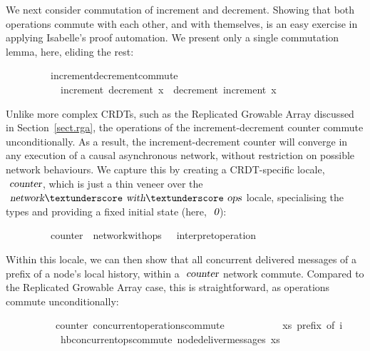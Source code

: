 We next consider commutation of increment and decrement.
Showing that both operations commute with each other, and with themselves, is an easy exercise in applying Isabelle's proof automation.
We present only a single commutation lemma, here, eliding the rest:
\vspace{0.375em}
\begin{isabellebody}
\ \ \ \ \ \ \ \ \ increment{\isacharunderscore}decrement{\isacharunderscore}commute{\isacharcolon}\isanewline
\ \ \ \ \ \ \ \ \ \ \ {\isachardoublequoteopen}increment\ {\isacharparenleft}decrement\ x{\isacharparenright}\ {\isacharequal}\ decrement\ {\isacharparenleft}increment\ x{\isacharparenright}{\isachardoublequoteclose}
\end{isabellebody}
\vspace{0.375em}
Unlike more complex CRDTs, such as the Replicated Growable Array discussed in Section~\ref{sect.rga}, the operations of the increment-decrement counter commute unconditionally.
As a result, the increment-decrement counter will converge in any execution of a causal asynchronous network, without restriction on possible network behaviours.
We capture this by creating a CRDT-specific locale, $\isa{counter}$, which is just a thin veneer over the $\isa{network}{\isacharunderscore}\isa{with}{\isacharunderscore}\isa{ops}$ locale, specialising the types and providing a fixed initial state (here, $\isa{0}$):
\vspace{0.375em}
\begin{isabellebody}
\ \ \ \ \ \ \ \ \ counter\ {\isacharequal}\ network{\isacharunderscore}with{\isacharunderscore}ops\ {\isacharunderscore}\ {\isacharunderscore}\ interpret{\isacharunderscore}operation\ {}
\end{isabellebody}
\vspace{0.375em}
Within this locale, we can then show that all concurrent delivered messages of a prefix of a node's local history, within a $\isa{counter}$ network commute.
Compared to the Replicated Growable Array case, this is straightforward, as operations commute unconditionally:
\vspace{0.375em}
\begin{isabellebody}
\ \ \ \ \ \ \ \ \ {\isacharparenleft}\ counter{\isacharparenright}\ concurrent{\isacharunderscore}operations{\isacharunderscore}commute{\isacharcolon}\isanewline
\ \ \ \ \ \ \ \ \ \ \ {\isachardoublequoteopen}xs\ prefix\ of\ i{\isachardoublequoteclose}\isanewline
\ \ \ \ \ \ \ \ \ \ \ {\isachardoublequoteopen}hb{\isachardot}concurrent{\isacharunderscore}ops{\isacharunderscore}commute\ {\isacharparenleft}node{\isacharunderscore}deliver{\isacharunderscore}messages\ xs{\isacharparenright}{\isachardoublequoteclose}
\end{isabellebody}
